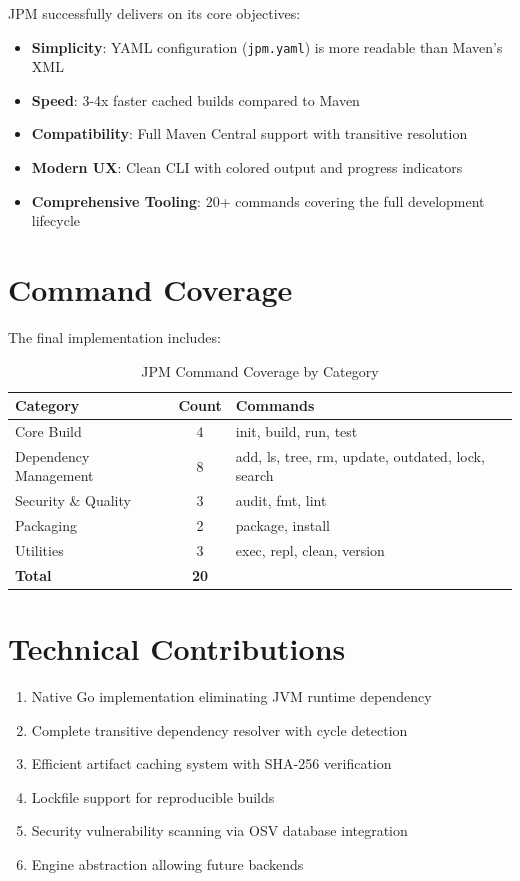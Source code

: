 \documentclass[12pt,a4paper]{report}
\begin{document}
JPM successfully delivers on its core objectives:

\begin{itemize}
    \item \textbf{Simplicity}: YAML configuration (\texttt{jpm.yaml}) is more readable than Maven's XML
    \item \textbf{Speed}: 3-4x faster cached builds compared to Maven
    \item \textbf{Compatibility}: Full Maven Central support with transitive resolution
    \item \textbf{Modern UX}: Clean CLI with colored output and progress indicators
    \item \textbf{Comprehensive Tooling}: 20+ commands covering the full development lifecycle
\end{itemize}

\section{Command Coverage}

The final implementation includes:

\begin{table}[H]
\centering
\begin{tabular}{lcl}
\toprule
\textbf{Category} & \textbf{Count} & \textbf{Commands} \\
\midrule
Core Build & 4 & init, build, run, test \\
Dependency Management & 8 & add, ls, tree, rm, update, outdated, lock, search \\
Security \& Quality & 3 & audit, fmt, lint \\
Packaging & 2 & package, install \\
Utilities & 3 & exec, repl, clean, version \\
\midrule
\textbf{Total} & \textbf{20} & \\
\bottomrule
\end{tabular}
\caption{JPM Command Coverage by Category}
\end{table}

\section{Technical Contributions}

\begin{enumerate}
    \item Native Go implementation eliminating JVM runtime dependency
    \item Complete transitive dependency resolver with cycle detection
    \item Efficient artifact caching system with SHA-256 verification
    \item Lockfile support for reproducible builds
    \item Security vulnerability scanning via OSV database integration
    \item Engine abstraction allowing future backends
\end{enumerate}
\end{document}
